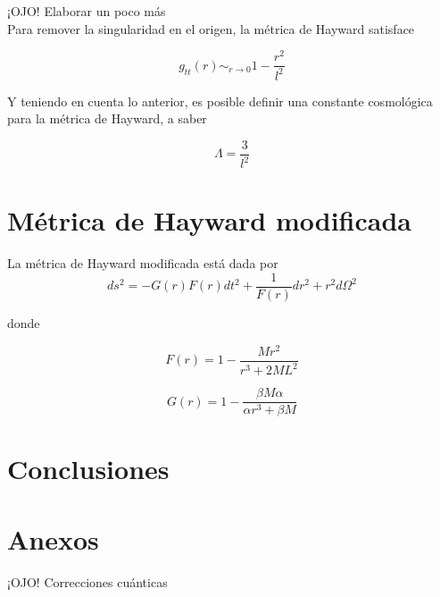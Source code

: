 \documentclass{article}
\numberwithin{equation}{section}
\begin{document}
¡OJO! Elaborar un poco más\\

Para remover la singularidad en el origen, la métrica de Hayward satisface 

\begin{equation}
g_{tt}(r) \sim_{r \to 0} 1 - \frac{r^2}{l^2}
\end{equation}

Y teniendo en cuenta lo anterior, es posible definir una constante cosmológica para la métrica de Hayward, a saber

\begin{equation}
\Lambda = \frac{3}{l^2}
\end{equation}

\section{Métrica de Hayward modificada}

La métrica de Hayward modificada está dada por 
\begin{equation}
\label{reg-schF}
ds^2 = -G(r)F(r) dt^2 + \frac{1}{F(r)} dr^2 + r^2d\Omega ^2
\end{equation}

donde

\begin{equation}
\label{mod-hay-f}
F(r) = 1 - \frac{Mr^2}{r^3 + 2ML^2}
\end{equation}

\begin{equation}
\label{mod-hay-g}
G(r) = 1 - \frac{\beta M \alpha}{\alpha r^3 + \beta M}
\end{equation}

\section{\label{conclusions} Conclusiones}

\section{\label{annex} Anexos}

¡OJO! Correcciones cuánticas\\


\nocite{*}


\end{document}
